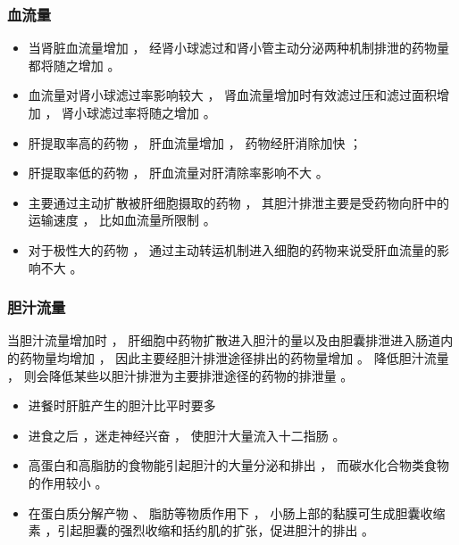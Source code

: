 \documentclass[dvipsnames, svgnames, x11names]{beamer}
\begin{document}
\begin{frame}
    \frametitle{血流量}
     
    \begin{itemize}
      \item 当肾脏血流量增加 ， 经肾小球滤过和肾小管主动分泌两种机制排泄的药物量都将随之增加 。
      \item 血流量对肾小球滤过率影响较大 ， 肾血流量增加时有效滤过压和滤过面积增加 ， 肾小球滤过率将随之增加 。
      \item 肝提取率高的药物 ， 肝血流量增加 ， 药物经肝消除加快 ；
      \item 肝提取率低的药物 ， 肝血流量对肝清除率影响不大 。 
      \item 主要通过主动扩散被肝细胞摄取的药物 ， 其胆汁排泄主要是受药物向肝中的运输速度 ， 比如血流量所限制 。
      \item 对于极性大的药物 ， 通过主动转运机制进入细胞的药物来说受肝血流量的影响不大 。
    \end{itemize}
     
\end{frame}


\begin{frame}
    \frametitle{胆汁流量}
    当胆汁流量增加时 ， 肝细胞中药物扩散进入胆汁的量以及由胆囊排泄进入肠道内的药物量均增加 ， 因此主要经胆汁排泄途径排出的药物量增加 。 降低胆汁流量 ， 则会降低某些以胆汁排泄为主要排泄途径的药物的排泄量 。
    \begin{itemize}
      \item 进餐时肝脏产生的胆汁比平时要多
      \item 进食之后 ，迷走神经兴奋 ， 使胆汁大量流入十二指肠 。
      \item 高蛋白和高脂肪的食物能引起胆汁的大量分泌和排出 ， 而碳水化合物类食物的作用较小 。
      \item 在蛋白质分解产物 、 脂肪等物质作用下 ， 小肠上部的黏膜可生成胆囊收缩素 ，引起胆囊的强烈收缩和括约肌的扩张，促进胆汁的排出 。
    \end{itemize}
\end{frame}
\end{document}
